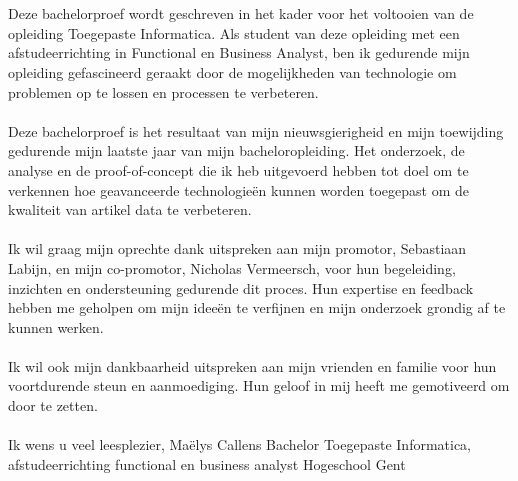 
\chapter*{}%
\label{ch:voorwoord}


Deze bachelorproef wordt geschreven in het kader voor het voltooien van de opleiding Toegepaste Informatica. Als student van deze opleiding met een afstudeerrichting in Functional en Business Analyst, ben ik gedurende mijn opleiding gefascineerd geraakt door de mogelijkheden van technologie om problemen op te lossen en processen te verbeteren.
\\ \\
Deze bachelorproef is het resultaat van mijn nieuwsgierigheid en mijn toewijding gedurende mijn laatste jaar van mijn bacheloropleiding. Het onderzoek, de analyse en de proof-of-concept die ik heb uitgevoerd hebben tot doel om te verkennen hoe geavanceerde technologieën kunnen worden toegepast om de kwaliteit van artikel data te verbeteren.
\\ \\
Ik wil graag mijn oprechte dank uitspreken aan mijn promotor, Sebastiaan Labijn, en mijn co-promotor, Nicholas Vermeersch, voor hun begeleiding, inzichten en ondersteuning gedurende dit proces. Hun expertise en feedback hebben me geholpen om mijn ideeën te verfijnen en mijn onderzoek grondig af te kunnen werken.
\\ \\
Ik wil ook mijn dankbaarheid uitspreken aan mijn vrienden en familie voor hun voortdurende steun en aanmoediging. Hun geloof in mij heeft me gemotiveerd om door te zetten.
\\ \\ %
Ik wens u veel leesplezier,
\newline Maëlys Callens
\newline Bachelor Toegepaste Informatica, afstudeerrichting functional en business analyst
\newline Hogeschool Gent
